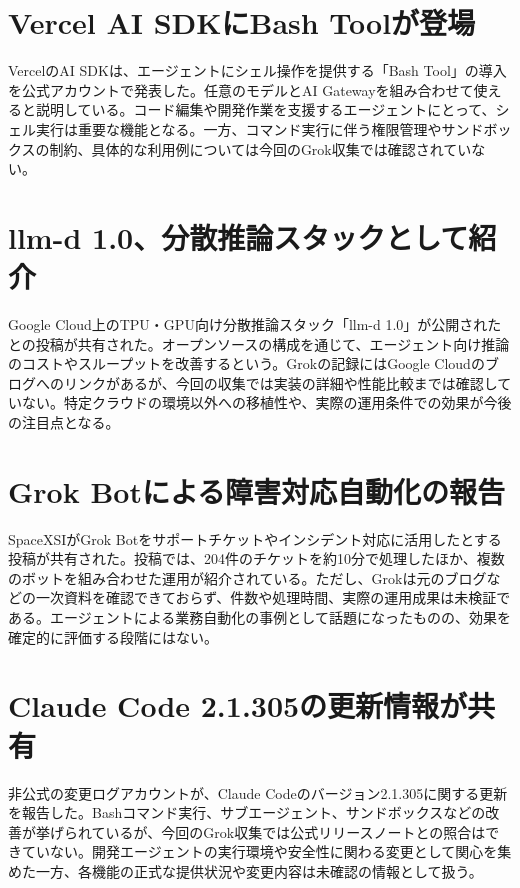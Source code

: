 \section{Vercel AI SDKにBash Toolが登場}
VercelのAI SDKは、エージェントにシェル操作を提供する「Bash Tool」の導入を公式アカウントで発表した。任意のモデルとAI Gatewayを組み合わせて使えると説明している。コード編集や開発作業を支援するエージェントにとって、シェル実行は重要な機能となる。一方、コマンド実行に伴う権限管理やサンドボックスの制約、具体的な利用例については今回のGrok収集では確認されていない。

\section{llm-d 1.0、分散推論スタックとして紹介}
Google Cloud上のTPU・GPU向け分散推論スタック「llm-d 1.0」が公開されたとの投稿が共有された。オープンソースの構成を通じて、エージェント向け推論のコストやスループットを改善するという。Grokの記録にはGoogle Cloudのブログへのリンクがあるが、今回の収集では実装の詳細や性能比較までは確認していない。特定クラウドの環境以外への移植性や、実際の運用条件での効果が今後の注目点となる。

\section{Grok Botによる障害対応自動化の報告}
SpaceXSIがGrok Botをサポートチケットやインシデント対応に活用したとする投稿が共有された。投稿では、204件のチケットを約10分で処理したほか、複数のボットを組み合わせた運用が紹介されている。ただし、Grokは元のブログなどの一次資料を確認できておらず、件数や処理時間、実際の運用成果は未検証である。エージェントによる業務自動化の事例として話題になったものの、効果を確定的に評価する段階にはない。

\section{Claude Code 2.1.305の更新情報が共有}
非公式の変更ログアカウントが、Claude Codeのバージョン2.1.305に関する更新を報告した。Bashコマンド実行、サブエージェント、サンドボックスなどの改善が挙げられているが、今回のGrok収集では公式リリースノートとの照合はできていない。開発エージェントの実行環境や安全性に関わる変更として関心を集めた一方、各機能の正式な提供状況や変更内容は未確認の情報として扱う。
